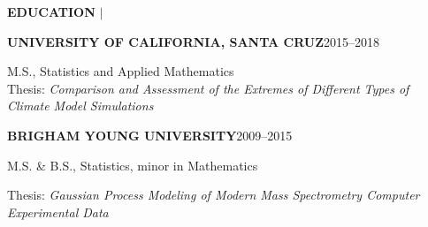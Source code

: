 \documentclass[12pt]{article}
\newcommand{\entrypar}[5]{
    \textbf{\MakeUppercase{#1}}\hfill #3--#4

    \textbf{#2}

    #5
    }
\begin{document}
\bigskip
\bigskip

\begin{minipage}[t]{0.19\textwidth}
    \begin{flushright}
        \textbf{EDUCATION} $\vert$ \ \
    \end{flushright}
\end{minipage}%
%
\begin{minipage}[t]{0.81\textwidth}
    \begin{flushleft}
        \entrypar{University of California, Santa Cruz}{\vspace{-12pt}}{2015}{2018}{M.S., Statistics and Applied Mathematics} \\
        \smallskip
        \smallskip
        Thesis: \emph{Comparison and Assessment of the Extremes of Different Types of Climate Model Simulations}

        \entrypar{Brigham Young University}{\vspace{-12pt}}{2009}{2015}{M.S. \& B.S., Statistics, minor in Mathematics}

        Thesis: \emph{Gaussian Process Modeling of Modern Mass Spectrometry Computer Experimental Data}
    \end{flushleft}
\end{minipage}
\end{document}

